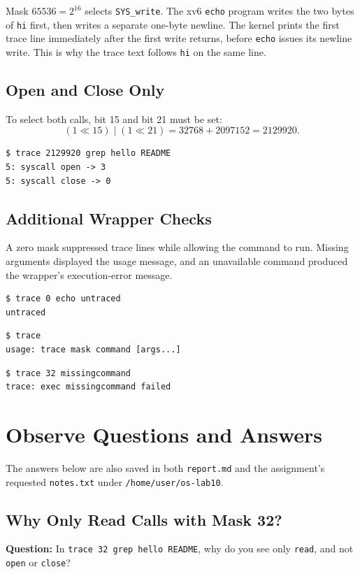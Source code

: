 \documentclass[12pt,a4paper]{article}
\begin{document}
Mask \(65536=2^{16}\) selects \texttt{SYS\_write}. The xv6 \texttt{echo} program
writes the two bytes of \texttt{hi} first, then writes a separate one-byte newline.
The kernel prints the first trace line immediately after the first write returns,
before \texttt{echo} issues its newline write. This is why the trace text follows
\texttt{hi} on the same line.

\subsection{Open and Close Only}
To select both calls, bit 15 and bit 21 must be set:
\[
  (1\ll15)\;|\;(1\ll21)=32768+2097152=2129920.
\]

\begin{lstlisting}[caption={Experimental verification of the open-and-close mask}]
$ trace 2129920 grep hello README
5: syscall open -> 3
5: syscall close -> 0
\end{lstlisting}

\subsection{Additional Wrapper Checks}
A zero mask suppressed trace lines while allowing the command to run. Missing
arguments displayed the usage message, and an unavailable command produced the
wrapper's execution-error message.

\begin{lstlisting}[caption={Additional command-line check}]
$ trace 0 echo untraced
untraced
\end{lstlisting}

\begin{lstlisting}[caption={Additional command-line check}]
$ trace
usage: trace mask command [args...]
\end{lstlisting}

\begin{lstlisting}[caption={Additional command-line check}]
$ trace 32 missingcommand
trace: exec missingcommand failed
\end{lstlisting}

\section{Observe Questions and Answers}
The answers below are also saved in both \texttt{report.md} and the assignment's
requested \texttt{notes.txt} under \texttt{/home/user/os-lab10}.

\subsection{Why Only Read Calls with Mask 32?}
\textbf{Question:} In \texttt{trace 32 grep hello README}, why do you see only
\texttt{read}, and not \texttt{open} or \texttt{close}?
\end{document}
